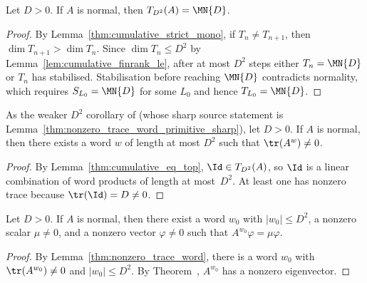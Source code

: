 \begin{lemma}\label{thm:cumulative_eq_top_bound}
    \leanok
    Let $D>0$. If $A$ is normal, then
    $T_{D^2}(A)=\MN{D}$.
\end{lemma}

\begin{proof}
    \leanok
    By Lemma~\ref{thm:cumulative_strict_mono}, if
    $T_n\neq T_{n+1}$, then $\dim T_{n+1}>\dim T_n$.
    Since $\dim T_n\le D^2$ by Lemma~\ref{lem:cumulative_finrank_le},
    after at most $D^2$ steps either $T_n=\MN{D}$ or $T_n$ has stabilised.
    Stabilisation before reaching $\MN{D}$ contradicts normality, which
    requires $S_{L_0}=\MN{D}$ for some $L_0$ and hence
    $T_{L_0}=\MN{D}$.
\end{proof}

\begin{lemma}\label{thm:nonzero_trace_word}
    \leanok
    As the weaker $D^2$ corollary of \cite[Lemma~1]{Sanz2010Quantum} (whose
    sharp source statement is
    Lemma~\ref{thm:nonzero_trace_word_primitive_sharp}), let $D>0$. If $A$ is
    normal, then there exists a word $w$ of length at most $D^2$ such that
    $\tr(A^w)\neq0$.
\end{lemma}

\begin{proof}
    \leanok
    By Lemma~\ref{thm:cumulative_eq_top}, $\Id\in T_{D^2}(A)$, so $\Id$
    is a linear combination of word products of length at most~$D^2$.
    At least one has nonzero trace because $\tr(\Id)=D\neq0$.
\end{proof}


\begin{lemma}\label{thm:eigenvalue_extraction}
    \leanok
    Let $D>0$. If $A$ is normal, then there exist a word $w_0$ with
    $|w_0|\le D^2$, a nonzero scalar $\mu\neq0$, and a nonzero vector
    $\varphi\neq0$ such that $A^{w_0}\varphi=\mu\varphi$.
\end{lemma}

\begin{proof}
    \leanok
    By Lemma~\ref{thm:nonzero_trace_word}, there is a word $w_0$ with
    $\tr(A^{w_0})\neq0$ and $|w_0|\le D^2$.
    By Theorem~\cite[``Nonzero trace implies eigenvector'']{QICLean2026Blueprint}, $A^{w_0}$ has a nonzero
    eigenvector.
\end{proof}

